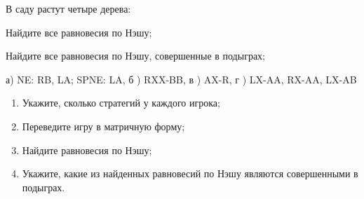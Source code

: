 \begin{problem}

В саду растут четыре дерева:\par
{}
Найдите все равновесия по Нэшу;\par
Найдите все равновесия по Нэшу, совершенные в подыграх;



\begin{sol}
 а)  NE: RB, LA; SPNE: LA, б ) RXX-BB, в ) AX-R, г ) LX-AA, RX-AA, LX-AB
\end{sol}
\end{problem}



\begin{problem}
{}
\begin{enumerate}
\item  Укажите, сколько стратегий у каждого игрока;\par
\item Переведите игру в матричную форму;\par
\item Найдите равновесия по Нэшу;\par
\item Укажите, какие из найденных равновесий по Нэшу являются совершенными в подыграх.
\end{enumerate}
\begin{sol}
\end{sol}
\end{problem}





